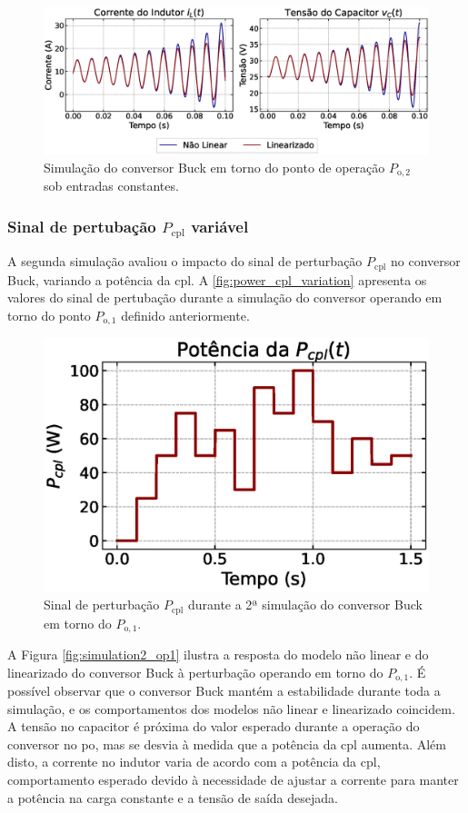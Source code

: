 \begin{figure}[H]
  \centering
  \captionsetup{justification=centering}
  \includegraphics[width=1.\textwidth]{figuras/buck/sim1/op2/result.eps}
  \caption{Simulação do conversor Buck em torno do ponto de operação $P_{\mathrm{o}, 2}$ sob entradas constantes.}
  \label{fig:simulation_1_buck_2}
\end{figure}

\subsubsection{Sinal de pertubação $P_{\textrm{cpl}}$ variável}

A segunda simulação avaliou o impacto do sinal de perturbação $P_{\mathrm{cpl}}$ no conversor Buck, variando a potência da \acrshort{cpl}. A \autoref{fig:power_cpl_variation} apresenta os valores do sinal de pertubação durante a simulação do conversor operando em torno do ponto $P_{\mathrm{o}, 1}$ definido anteriormente.

\begin{figure}[H]
  \centering
  \includegraphics[width=.5\textwidth]{figuras/buck/sim2/op1/power_cpl_variation.eps}
  \captionsetup{justification=centering}
  \caption{Sinal de perturbação $P_{\mathrm{cpl}}$ durante a 2ª simulação do conversor Buck em torno do $P_{\mathrm{o}, 1}$.}
  \label{fig:power_cpl_variation}
\end{figure}

A Figura \ref{fig:simulation2_op1} ilustra a resposta do modelo não linear e do linearizado do conversor Buck à perturbação operando em torno do $P_{\mathrm{o}, 1}$.  É possível observar que o conversor Buck mantém a estabilidade durante toda a simulação, e os comportamentos dos modelos não linear e linearizado coincidem. A tensão no capacitor é próxima do valor esperado durante a operação do conversor no \acrshort{po}, mas se desvia à medida que a potência da \acrshort{cpl} aumenta. Além disto, a corrente no indutor varia de acordo com a potência da \acrshort{cpl}, comportamento esperado devido à necessidade de ajustar a corrente para manter a potência na carga constante e a tensão de saída desejada.

